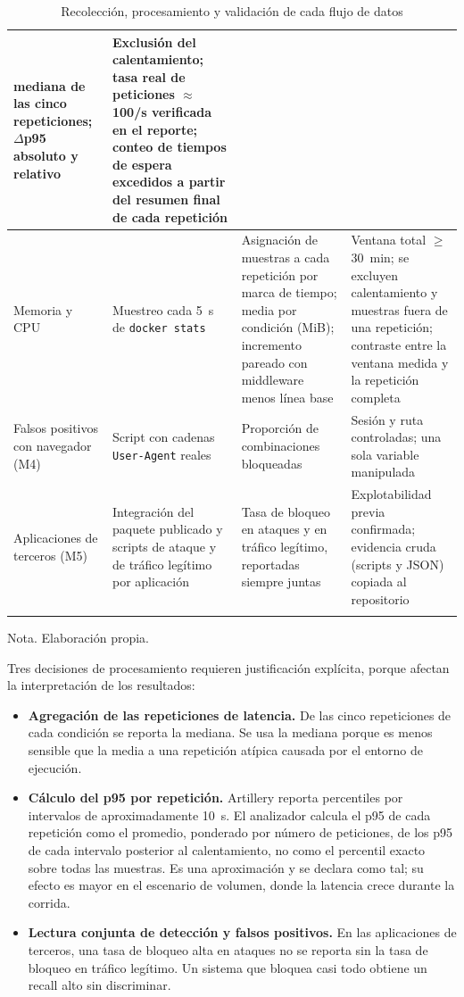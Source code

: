 \begin{longtable}{|L{2.3cm}|L{3.4cm}|L{3.4cm}|L{3.7cm}|}
mediana de las cinco repeticiones; $\Delta$p95 absoluto y relativo & Exclusión del
calentamiento; tasa real de peticiones $\approx$100/s verificada en el reporte; conteo de
tiempos de espera excedidos a partir del resumen final de cada repetición \\ \hline
Memoria y CPU & Muestreo cada 5~s de \texttt{docker stats} & Asignación de muestras a cada
repetición por marca de tiempo; media por condición (MiB); incremento pareado con middleware menos línea
base & Ventana total $\geq$30~min; se excluyen calentamiento y muestras fuera de una repetición;
contraste entre la ventana medida y la repetición completa \\ \hline
Falsos positivos con navegador (M4) & Script con cadenas \texttt{User-Agent} reales &
Proporción de combinaciones bloqueadas & Sesión y ruta controladas; una sola variable manipulada \\ \hline
Aplicaciones de terceros (M5) & Integración del paquete publicado y scripts de ataque y de
tráfico legítimo por aplicación & Tasa de bloqueo en ataques y en tráfico legítimo, reportadas
siempre juntas & Explotabilidad previa confirmada; evidencia cruda (scripts y JSON) copiada al
repositorio \\ \hline
\caption[Recolección, procesamiento y validación de datos]{Recolección, procesamiento y validación de cada flujo de datos}
\label{tab:met-datos}
\end{longtable}
{\footnotesize Nota. Elaboración propia.}

Tres decisiones de procesamiento requieren justificación explícita, porque afectan la
interpretación de los resultados:

\begin{itemize}
    \item \textbf{Agregación de las repeticiones de latencia.} De las cinco repeticiones de cada condición se reporta la mediana. Se usa la mediana porque es menos sensible que la media a una repetición atípica
    causada por el entorno de ejecución.
    \item \textbf{Cálculo del p95 por repetición.} Artillery reporta percentiles por intervalos
    de aproximadamente 10~s. El analizador calcula el p95 de cada repetición como el promedio,
    ponderado por número de peticiones, de los p95 de cada intervalo posterior al calentamiento,
    no como el percentil exacto sobre todas las muestras. Es una aproximación y se declara como
    tal; su efecto es mayor en el escenario de volumen, donde la latencia crece durante la corrida.
    \item \textbf{Lectura conjunta de detección y falsos positivos.} En las aplicaciones de
    terceros, una tasa de bloqueo alta en ataques no se reporta sin la tasa de bloqueo en tráfico
    legítimo. Un sistema que bloquea casi todo obtiene un recall alto sin discriminar.
\end{itemize}

